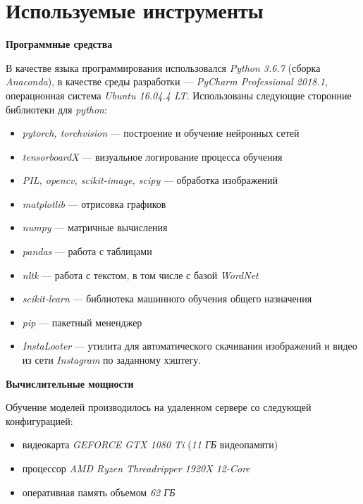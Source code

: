 \section{Используемые инструменты}

\textbf{Программные средства}

\indent
В качестве языка программирования использовался
 \textit{Python 3.6.7} (сборка \textit{Anaconda}),
 в качестве среды разработки --- \textit{PyCharm Professional 2018.1},
 операционная система \textit{Ubuntu 16.04.4 LT}. Использованы
 следующие сторонние библиотеки для \textit{python}:


\begin{itemize}
    \item \textit{pytorch, torchvision} --- построение и обучение нейронных сетей
    \item \textit{tensorboardX} --- визуальное логирование процесса обучения 
    \item \textit{PIL, opencv, scikit-image, scipy} --- обработка изображений
    \item \textit{matplotlib} --- отрисовка графиков
    \item \textit{numpy} --- матричные вычисления
    \item \textit{pandas} --- работа с таблицами
    \item \textit{nltk} --- работа с текстом, в том числе с базой \textit{WordNet}
    \item \textit{scikit-learn} --- библиотека машинного обучения общего назначения
    \item \textit{pip} --- пакетный мененджер
    \item \textit{InstaLooter} --- утилита для автоматического скачивания
    изображений и видео из сети \textit{Instagram} по заданному хэштегу.
    
\end{itemize}


\bigskip


\textbf{Вычислительные мощности}

\indent
\indent
Обучение моделей производилось на удаленном сервере со следующей конфигурацией:
\begin{itemize}
    \item видеокарта \textit{GEFORCE GTX 1080 Ti} (\textit{11 ГБ} видеопамяти)
    \item процессор \textit{AMD Ryzen Threadripper 1920X 12-Core}
    \item оперативная память объемом  \textit{62 ГБ}
\end{itemize}
